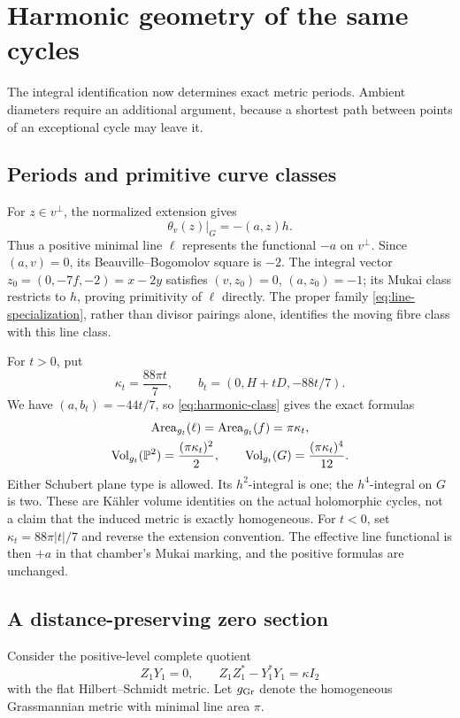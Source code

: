 \section{Harmonic geometry of the same cycles}\label{sec:cycle-metrics}

The integral identification now determines exact metric periods.
Ambient diameters require an additional argument, because a shortest
path between points of an exceptional cycle may leave it.

\subsection{Periods and primitive curve classes}
For \(z\in v^\perp\), the normalized extension gives
\[
 \theta_v(z)|_G=-(a,z)h .
\]
Thus a positive minimal line \(\ell\) represents the functional
\(-a\) on \(v^\perp\). Since \((a,v)=0\), its
Beauville--Bogomolov square is \(-2\).
The integral vector \(z_0=(0,-7f,-2)=x-2y\) satisfies
\((v,z_0)=0\), \((a,z_0)=-1\); its Mukai class restricts to
\(h\), proving primitivity of \(\ell\) directly.
The proper family \eqref{eq:line-specialization}, rather than
divisor pairings alone, identifies the moving fibre class with
this line class.

For \(t>0\), put
\begin{equation}\label{eq:kappa-scale}
 \kappa_t=\frac{88\pi t}{7},\qquad
 b_t=(0,H+tD,-88t/7).
\end{equation}
We have \((a,b_t)=-44t/7\), so
\eqref{eq:harmonic-class} gives the exact formulas
\begin{equation}\label{eq:cycle-volumes}
 \begin{gathered}
 \operatorname{Area}_{g_t}(\ell)=\operatorname{Area}_{g_t}(f)
       =\pi\kappa_t,\\
 \operatorname{Vol}_{g_t}(\mathbb P^2)=\frac{(\pi\kappa_t)^2}{2},\qquad
 \operatorname{Vol}_{g_t}(G)=\frac{(\pi\kappa_t)^4}{12}.
 \end{gathered}
\end{equation}
Either Schubert plane type is allowed. Its \(h^2\)-integral is
one; the \(h^4\)-integral on \(G\) is two.
These are Kähler volume identities on the actual holomorphic
cycles, not a claim that the induced metric is exactly homogeneous.
For \(t<0\), set \(\kappa_t=88\pi|t|/7\) and reverse the
extension convention. The effective line functional is then
\(+a\) in that chamber's Mukai marking, and the positive
formulas are unchanged.

\subsection{A distance-preserving zero section}
Consider the positive-level complete quotient
\[
 Z_1Y_1=0,\qquad Z_1Z_1^*-Y_1^*Y_1=\kappa I_2
\]
with the flat Hilbert--Schmidt metric. Let \(g_{\operatorname{Gr}}\) denote
the homogeneous Grassmannian metric with minimal line area
\(\pi\).

